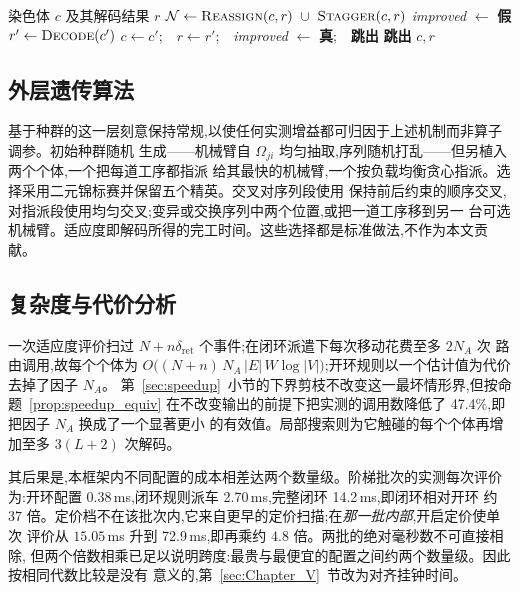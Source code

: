 \documentclass[manuscript,screen,review]{acmart}
\newcommand{\RouteCallCut}{47.4\%}
\newcommand{\MsOpen}{0.38}
\newcommand{\MsLoopRule}{2.70}
\newcommand{\MsLoopProbe}{14.2}
\newcommand{\MsPriced}{72.9}
\begin{document}
\begin{algorithm}[t]
\caption{\textsc{ContentionGuidedSearch}:冲突制导的局部搜索}
\label{alg:ls}
\small
\begin{algorithmic}[1]
\Require 染色体 $c$ 及其解码结果 $r$
  \State $\mathcal{N}\gets\textsc{Reassign}(c,r)\ \cup\ \textsc{Stagger}(c,r)$
  \State \textit{improved} $\gets$ \textbf{假}
    \State $r'\gets\textsc{Decode}(c')$
      \State $c\gets c'$;\ \ $r\gets r'$;\ \ \textit{improved} $\gets$
             \textbf{真};\ \ \textbf{跳出}
    \EndIf
  \EndFor
   \State \textbf{跳出} \EndIf
\EndFor
\State \Return $c,r$
\end{algorithmic}
\end{algorithm}

\subsection{外层遗传算法}

基于种群的这一层刻意保持常规,以使任何实测增益都可归因于上述机制而非算子调参。初始种群随机
生成——机械臂自 $\Omega_{ji}$ 均匀抽取,序列随机打乱——但另植入两个个体,一个把每道工序都指派
给其最快的机械臂,一个按负载均衡贪心指派。选择采用二元锦标赛并保留五个精英。交叉对序列段使用
保持前后约束的顺序交叉,对指派段使用均匀交叉;变异或交换序列中两个位置,或把一道工序移到另一
台可选机械臂。适应度即解码所得的完工时间。这些选择都是标准做法,不作为本文贡献。

\subsection{复杂度与代价分析}

一次适应度评价扫过 $N+n\delta_{\mathrm{ret}}$ 个事件;在闭环派遣下每次移动花费至多 $2N_A$ 次
路由调用,故每个个体为
$O\bigl((N+n)\,N_A\,|E|\,W\log|V|\bigr)$;开环规则以一个估计值为代价去掉了因子 $N_A$。
第~\ref{sec:speedup}~小节的下界剪枝不改变这一最坏情形界,但按命题~\ref{prop:speedup_equiv}
在不改变输出的前提下把实测的调用数降低了 \RouteCallCut{},即把因子 $N_A$ 换成了一个显著更小
的有效值。局部搜索则为它触碰的每个个体再增加至多 $3(L+2)$ 次解码。

其后果是,本框架内不同配置的成本相差达两个数量级。阶梯批次的实测每次评价为:开环配置
\MsOpen{}\,ms,闭环规则派车 \MsLoopRule{}\,ms,完整闭环 \MsLoopProbe{}\,ms,即闭环相对开环
约 $37$ 倍。定价档不在该批次内,它来自更早的定价扫描;在\emph{那一批内部},开启定价使单次
评价从 $15.05$\,ms 升到 \MsPriced{}\,ms,即再乘约 $4.8$ 倍。两批的绝对毫秒数不可直接相除,
但两个倍数相乘已足以说明跨度:最贵与最便宜的配置之间约两个数量级。因此按相同代数比较是没有
意义的,第~\ref{sec:Chapter_V}~节改为对齐挂钟时间。
\end{document}
